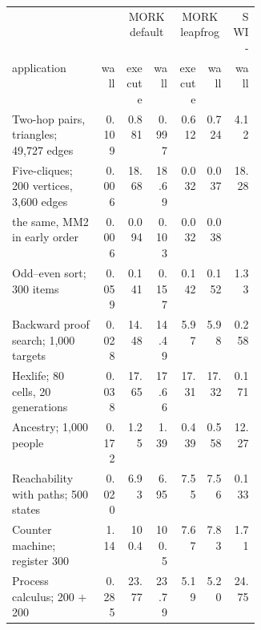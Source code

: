 \begin{center}
\small
\setlength{\tabcolsep}{3.5pt}
\begin{tabular}{@{}p{0.36\linewidth}rrrrrr@{}}
\toprule
 & \CeTTa{} & \multicolumn{2}{c}{MORK default} & \multicolumn{2}{c}{MORK leapfrog} & SWI-\PeTTa{} \\
\cmidrule(lr){3-4}\cmidrule(lr){5-6}
application & wall & execute & wall & execute & wall & wall \\
\midrule
Two-hop pairs, triangles; 49,727 edges & 0.109 & 0.881 & 0.997 & 0.612 & 0.724 & 4.12 \\
Five-cliques; 200 vertices, 3,600 edges & 0.006 & 18.68 & 18.69 & 0.032 & 0.037 & 18.28 \\
\quad the same, MM2 in early order & 0.006 & 0.094 & 0.103 & 0.032 & 0.038 &  \\
Odd--even sort; 300 items & 0.059 & 0.141 & 0.157 & 0.142 & 0.152 & 1.33 \\
Backward proof search; 1,000 targets & 0.028 & 14.48 & 14.49 & 5.97 & 5.98 & 0.258 \\
Hexlife; 80 cells, 20 generations & 0.038 & 17.65 & 17.66 & 17.31 & 17.32 & 0.171 \\
Ancestry; 1,000 people & 0.172 & 1.25 & 1.39 & 0.439 & 0.558 & 12.27 \\
Reachability with paths; 500 states & 0.020 & 6.93 & 6.95 & 7.55 & 7.56 & 0.133 \\
Counter machine; register 300 & 1.14 & 100.4 & 100.5 & 7.67 & 7.83 & 1.71 \\
Process calculus; 200 $+$ 200 & 0.285 & 23.77 & 23.79 & 5.19 & 5.20 & 24.75 \\
\bottomrule
\end{tabular}
\end{center}

